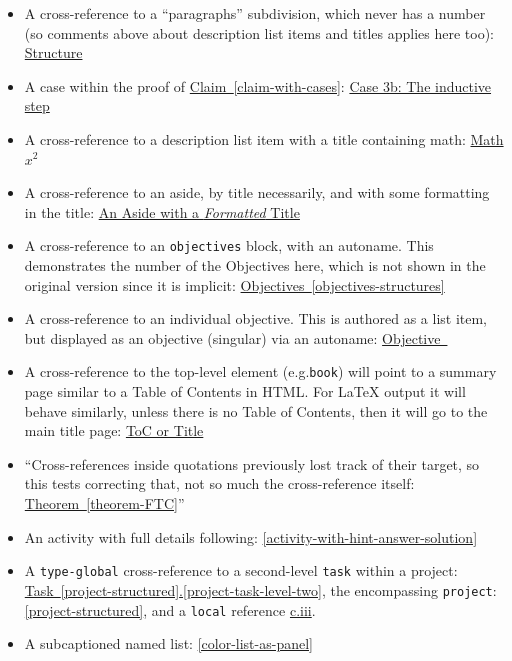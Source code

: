 \documentclass{sn-jnl}
\theoremstyle{thmstyleone}%
\theoremstyle{thmstyletwo}%
\theoremstyle{thmstylethree}%
\newcommand{\xreffont}{\relax}
\newcommand{\mono}[1]{\texttt{#1}}
\numberwithin{equation}{section}
\begin{document}
\begin{itemize}[label=\textbullet]
\item{}A cross-reference to a ``paragraphs'' subdivision, which never has a number (so comments above about description list items and titles applies here too): \hyperlink{hierarchy-structure}{Structure}%
\item{}A case within the proof of \hyperref[claim-with-cases]{Claim~{\xreffont\ref{claim-with-cases}}}: \hyperlink{inductive-step}{Case 3b: The inductive step}%
\item{}A cross-reference to a description list item with a title containing math: \hyperlink{description-list-math-title}{Math \(x^2\)}%
\item{}A cross-reference to an aside, by title necessarily, and with some formatting in the title: \hyperref[an-aside]{An Aside with a \emph{Formatted} Title}%
\item{}A cross-reference to an \mono{objectives} block, with an autoname.  This demonstrates the number of the Objectives here, which is not shown in the original version since it is implicit: \hyperref[objectives-structures]{Objectives~{\xreffont\ref{objectives-structures}}}%
\item{}A cross-reference to an individual objective.  This is authored as a list item, but displayed as an objective (singular) via an autoname: \hyperlink{objective-structure}{Objective~{\xreffont 1}}%
\item{}A cross-reference to the top-level element (e.g.\@\mono{book}) will point to a summary page similar to a Table of Contents in HTML.  For LaTeX output it will behave similarly, unless there is no Table of Contents, then it will go to the main title page:  \hyperlink{derivatives}{ToC or Title}%
\item{}``Cross-references inside quotations previously lost track of their target, so this tests correcting that, not so much the cross-reference itself: \hyperref[theorem-FTC]{Theorem~{\xreffont\ref{theorem-FTC}}}''%
\item{}An activity with full details following: \hyperref[activity-with-hint-answer-solution]{{\xreffont\ref{activity-with-hint-answer-solution}}}%
\item{}A \mono{type-global} cross-reference to a second-level \mono{task} within a project: \hyperref[project-task-level-two]{Task~{\xreffont\ref{project-structured}}.{\xreffont\ref{project-task-level-two}}}, the encompassing \mono{project}: \hyperref[project-structured]{{\xreffont\ref{project-structured}}}, and a \mono{local} reference \hyperref[project-task-level-two]{c.iii}.%
\item{}A subcaptioned named list: \hyperref[color-list-as-panel]{{\xreffont\ref{color-list-as-panel}}}%

\end{itemize}
\end{document}
